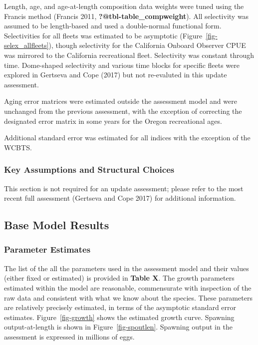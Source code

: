 \documentclass[
]{scrartcl}
\begin{document}
Length, age, and age-at-length composition data weights were tuned using
the Francis method (Francis 2011, \textbf{?@tbl-table\_compweight}). All
selectivity was assumed to be length-based and used a double-normal
functional form. Selectivities for all fleets was estimated to be
asymptotic (Figure~\ref{fig-selex_allfleets}), though selectivity for
the California Onboard Observer CPUE was mirrored to the California
recreational fleet. Selectivity was constant through time. Dome-shaped
selectivity and various time blocks for specific fleets were explored in
Gertseva and Cope (2017) but not re-evaluted in this update assessment.

Aging error matrices were estimated outside the assessment model and
were unchanged from the previous assessment, with the exception of
correcting the designated error matrix in some years for the Oregon
recreational ages.

Additional standard error was estimated for all indices with the
exception of the WCBTS.

\subsubsection{Key Assumptions and Structural
Choices}\label{key-assumptions-and-structural-choices}

This section is not required for an update assessment; please refer to
the most recent full assessment (Gertseva and Cope 2017) for additional
information.

\subsection{Base Model Results}\label{base-model-results}

\subsubsection{Parameter Estimates}\label{parameter-estimates}

The list of the all the parameters used in the assessment model and
their values (either fixed or estimated) is provided in \textbf{Table
X}. The growth parameters estimated within the model are reasonable,
commensurate with inspection of the raw data and consistent with what we
know about the species. These parameters are relatively precisely
estimated, in terms of the asymptotic standard error estimates.
Figure~\ref{fig-growth} shows the estimated growth curve. Spawning
output-at-length is shown in Figure~\ref{fig-spoutlen}. Spawning output
in the assessment is expressed in millions of eggs.
\end{document}
